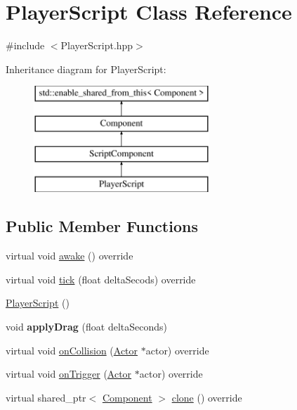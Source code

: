 \hypertarget{class_player_script}{}\section{Player\+Script Class Reference}
\label{class_player_script}


{\ttfamily \#include $<$Player\+Script.\+hpp$>$}

Inheritance diagram for Player\+Script\+:\begin{figure}[H]
\begin{center}
\leavevmode
\includegraphics[height=4.000000cm]{class_player_script}
\end{center}
\end{figure}
\subsection*{Public Member Functions}
\begin{DoxyCompactItemize}
\item 
virtual void \hyperlink{class_player_script_acb623eb7cdcfc49b7848bf7d60809cb7}{awake} () override
\item 
virtual void \hyperlink{class_player_script_a5cd8853a54348831521f0455df5b508c}{tick} (float delta\+Secods) override
\item 
\hyperlink{class_player_script_a6fdee043545a61122b85536d2555d00c}{Player\+Script} ()
\item 
\hypertarget{class_player_script_a4d5b5edb9cf9bd82455631f8a08f32a5}{}void {\bfseries apply\+Drag} (float delta\+Seconds)\label{class_player_script_a4d5b5edb9cf9bd82455631f8a08f32a5}

\item 
virtual void \hyperlink{class_player_script_aa57ebbefa2e5be812b9a0272ae654258}{on\+Collision} (\hyperlink{class_actor}{Actor} $\ast$actor) override
\item 
virtual void \hyperlink{class_player_script_ad5476bdc3f1b168047def498cd62844f}{on\+Trigger} (\hyperlink{class_actor}{Actor} $\ast$actor) override
\item 
virtual shared\+\_\+ptr$<$ \hyperlink{class_component}{Component} $>$ \hyperlink{class_player_script_a75a83f06a2acb93ce1a629dcf2dabf5c}{clone} () override
\end{DoxyCompactItemize}
